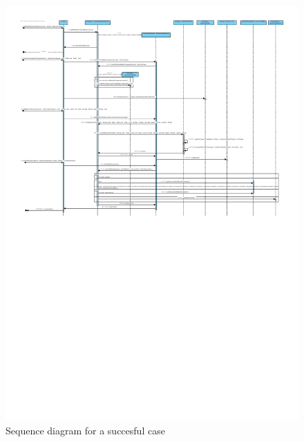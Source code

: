 \documentclass{ds-report}
\begin{document}
    \begin{figure}[t]
    \centering
    	\caption{Sequence diagram for a succesful case}
	\includegraphics[scale=0.85]{successfulSequenceDiagram}

	\end{figure}
	
\end{document}
